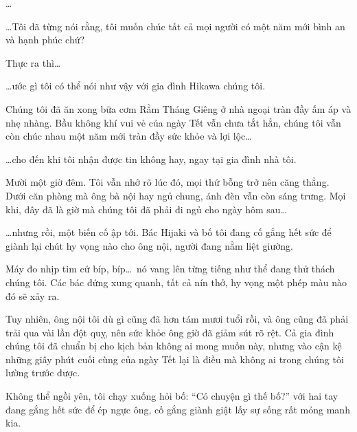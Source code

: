 \documentclass[../main.tex]{subfiles}
\begin{document}

\dots

\dots Tôi đã từng nói rằng, tôi muốn chúc tất cả mọi người có một năm mới bình an và hạnh phúc chứ?

Thực ra thì\dots

\dots ước gì tôi có thể nói như vậy với gia đình Hikawa chúng tôi.

\il

Chúng tôi đã ăn xong bữa cơm Rằm Tháng Giêng ở nhà ngoại tràn đầy ấm áp và nhẹ nhàng. Bầu không khí vui vẻ của ngày Tết vẫn chưa tắt hẳn, chúng tôi vẫn còn chúc nhau một năm mới tràn đầy sức khỏe và lợi lộc\dots

\dots cho đến khi tôi nhận được tin không hay, ngay tại gia đình nhà tôi.

Mười một giờ đêm. Tôi vẫn nhớ rõ lúc đó, mọi thứ bỗng trở nên căng thẳng. Dưới căn phòng mà ông bà nội hay ngủ chung, ánh đèn vẫn còn sáng trưng. Mọi khi, đây đã là giờ mà chúng tôi đã phải đi ngủ cho ngày hôm sau\dots

\dots nhưng rồi, một biến cố ập tới. Bác Hijaki và bố tôi đang cố gắng hết sức để giành lại chút hy vọng nào cho ông nội, người đang nằm liệt giường.

Máy đo nhịp tim cứ bíp, bíp\dots\ nó vang lên từng tiếng như thể đang thử thách chúng tôi. Các bác đứng xung quanh, tất cả nín thở, hy vọng một phép màu nào đó sẽ xảy ra.

Tuy nhiên, ông nội tôi dù gì cũng đã hơn tám mươi tuổi rồi, và ông cũng đã phải trải qua vài lần đột quỵ, nên sức khỏe ông giờ đã giảm sút rõ rệt. Cả gia đình chúng tôi đã chuẩn bị cho kịch bản không ai mong muốn này, nhưng vào cận kệ những giây phút cuối cùng của ngày Tết lại là điều mà không ai trong chúng tôi lường trước được.

Không thể ngồi yên, tôi chạy xuống hỏi bố: ``{\color{red}Có chuyện gì thế bố?}'' với hai tay đang gắng hết sức để ép ngực ông, cố gắng giành giật lấy sự sống rất mỏng manh kia.
\end{document}
